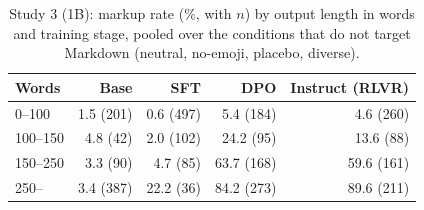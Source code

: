 \begin{table}[t]
\centering
\footnotesize
\caption{Study 3 (1B): markup rate (\%, with $n$) by output length in words and training stage, pooled over the conditions that do not target Markdown (neutral, no-emoji, placebo, diverse).}
\label{tab:v2-length}
\begin{tabular}{lrrrr}
\toprule
Words & Base & SFT & DPO & Instruct (RLVR) \\
\midrule
0--100 & 1.5 (201) & 0.6 (497) & 5.4 (184) & 4.6 (260) \\
100--150 & 4.8 (42) & 2.0 (102) & 24.2 (95) & 13.6 (88) \\
150--250 & 3.3 (90) & 4.7 (85) & 63.7 (168) & 59.6 (161) \\
250-- & 3.4 (387) & 22.2 (36) & 84.2 (273) & 89.6 (211) \\
\bottomrule
\end{tabular}
\end{table}
